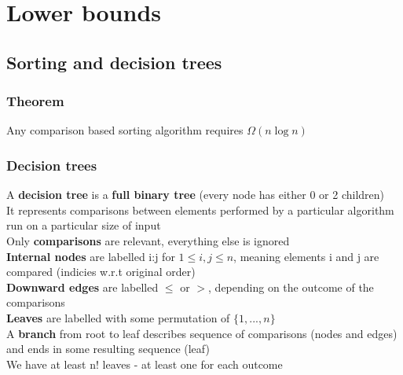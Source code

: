 \documentclass{article}[18pt]
\begin{document}
\section{Lower bounds}
\subsection{Sorting and decision trees}
\subsubsection{Theorem}
Any comparison based sorting algorithm requires $\Omega (n\log n)$
\subsubsection{Decision trees}
A \textbf{decision tree} is a \textbf{full binary tree} (every node has either 0 or 2 children)\\
It represents comparisons between elements performed by a particular algorithm run on a particular size of input\\
Only \textbf{comparisons} are relevant, everything else is ignored\\
\textbf{Internal nodes} are labelled i:j for $1\leqslant i, j\leqslant n$, meaning elements i and j are compared (indicies w.r.t original order)\\
\textbf{Downward edges} are labelled $\leqslant$ or $>$, depending on the outcome of the comparisons\\
\textbf{Leaves} are labelled with some permutation of $\{1,...,n\}$\\
A \textbf{branch} from root to leaf describes sequence of comparisons (nodes and edges) and ends in some resulting sequence (leaf)\\
We have at least n! leaves - at least one for each outcome
\end{document}
